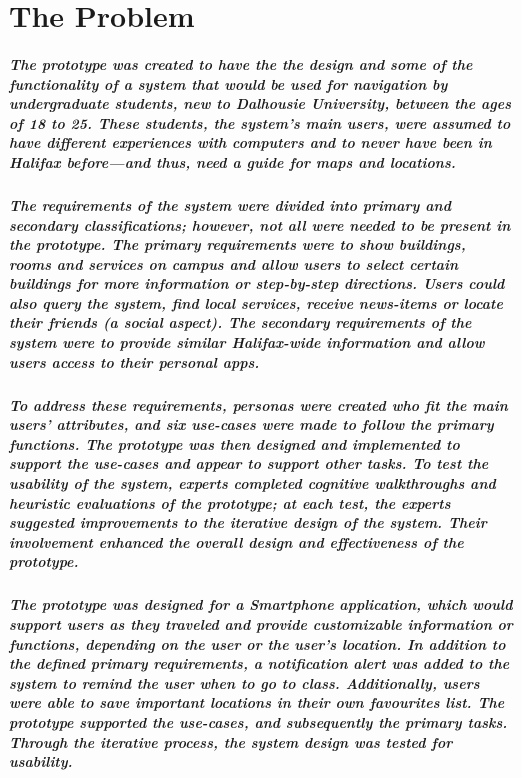 \documentclass{report}
\begin{document}
\chapter{The Problem}
    \paragraph{The prototype was created to have the the design and some of the
    functionality of a system that would be used for navigation by undergraduate
    students, new to Dalhousie University, between the ages of 18 to 25. These
    students, the system’s main users, were assumed to have different experiences
    with computers and to never have been in Halifax before—and thus, need a guide
    for maps and locations.}
    \paragraph{The requirements of the system were divided into primary and
    secondary classifications; however, not all were needed to be present in the
    prototype. The primary requirements were to show buildings, rooms and services
    on campus and allow users to select certain buildings for more information or
    step-by-step directions. Users could also query the system, find local services,
    receive news-items or locate their friends (a social aspect). The secondary
    requirements of the system were to provide similar Halifax-wide information and
    allow users access to their personal apps.}
    \paragraph{To address these requirements, personas were created who fit the
    main users’ attributes, and six use-cases were made to follow the primary
    functions. The prototype was then designed and implemented to support the
    use-cases and appear to support other tasks. To test the usability of the
    system, experts completed cognitive walkthroughs and heuristic evaluations of
    the prototype; at each test, the experts suggested improvements to the iterative
    design of the system. Their involvement enhanced the overall design and
    effectiveness of the prototype.}
    \paragraph{The prototype was designed for a Smartphone application, which
    would support users as they traveled and provide customizable information or
    functions, depending on the user or the user’s location. In addition to the
    defined primary requirements, a notification alert was added to the system to
    remind the user when to go to class. Additionally, users were able to save
    important locations in their own favourites list. The prototype supported the
    use-cases, and subsequently the primary tasks. Through the iterative process,
    the system design was tested for usability.}
\end{document}

